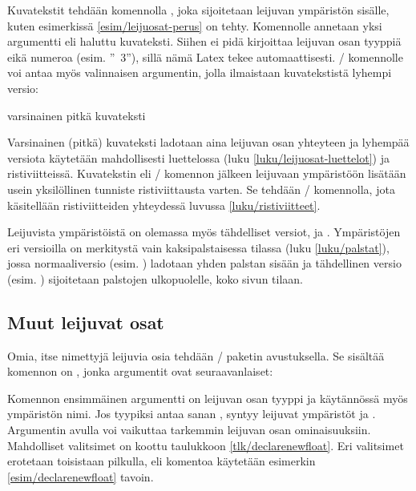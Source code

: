 Kuvatekstit tehdään komennolla , joka sijoitetaan
leijuvan ympäristön sisälle, kuten esimerkissä
\ref{esim/leijuosat-perus} on tehty. Komennolle annetaan yksi argumentti
eli haluttu kuvateksti. Siihen ei pidä kirjoittaa leijuvan osan tyyppiä
eikä numeroa (esim. ''\tablename~3''), sillä nämä Latex tekee
automaattisesti. \-/ komennolle voi antaa myös
valinnaisen argumentin, jolla ilmaistaan kuvatekstistä lyhempi versio:

\begin{koodilohkosis}
\caption[lyhyt kuvateksti]{varsinainen pitkä kuvateksti}
\end{koodilohkosis}

\noindent
Varsinainen (pitkä) kuvateksti ladotaan aina leijuvan osan yhteyteen ja
lyhempää versiota käytetään mahdollisesti luettelossa (luku
\ref{luku/leijuosat-luettelot}) ja ristiviitteissä. Kuvatekstin eli
\-/ komennon jälkeen leijuvaan ympäristöön lisätään
usein yksilöllinen tunniste ristiviittausta varten. Se tehdään
\-/ komennolla, jota käsitellään ristiviitteiden
yhteydessä luvussa \ref{luku/ristiviitteet}.

Leijuvista ympäristöistä on olemassa myös tähdelliset versiot,
 ja . Ympäristöjen eri versioilla
on merkitystä vain kaksipalstaisessa tilassa (luku \ref{luku/palstat}),
jossa normaaliversio (esim. ) ladotaan yhden palstan
sisään ja tähdellinen versio (esim. ) sijoitetaan
palstojen ulkopuolelle, koko sivun tilaan.

\subsection{Muut leijuvat osat}
\label{luku/leijuosat-omat}

Omia, itse nimettyjä leijuvia osia tehdään \-/
paketin avustuksella. Se sisältää komennon on
, jonka argumentit ovat seuraavanlaiset:

\begin{koodilohkosis}
\end{koodilohkosis}

\noindent
Komennon ensimmäinen argumentti  on leijuvan osan tyyppi
ja käytännössä myös ympäristön nimi. Jos tyypiksi antaa sanan
, syntyy leijuvat ympäristöt  ja
. Argumentin  avulla voi
vaikuttaa tarkemmin leijuvan osan ominaisuuksiin. Mahdolliset valitsimet
on koottu taulukkoon \ref{tlk/declarenewfloat}. Eri valitsimet erotetaan
toisistaan pilkulla, eli komentoa käytetään esimerkin
\ref{esim/declarenewfloat} tavoin.


